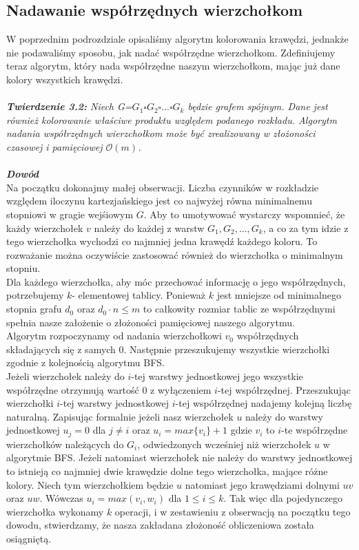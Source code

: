 \documentclass[12pt,a4paper,titlepage]{article}
\begin{document}
\subsection{Nadawanie współrzędnych wierzchołkom}
W poprzednim podrozdziale opisaliśmy algorytm kolorowania krawędzi, jednakże nie podawaliśmy sposobu, jak nadać współrzędne wierzchołkom. Zdefiniujemy teraz algorytm, który nada współrzędne naszym wierzchołkom, mając już dane kolory wszystkich krawędzi.\\
\\
\textit{\textbf{Twierdzenie 3.2:} Niech G=$G_1 \square G_2 \square ... \square G_k$ będzie grafem spójnym. Dane jest również kolorowanie właściwe produktu względem podanego rozkładu. Algorytm nadania współrzędnych wierzchołkom może być zrealizowany w złożoności czasowej i pamięciowej $\mathcal{O}(m)$.}\\
\\
\textit{\textbf{Dowód}}\\
Na początku dokonajmy małej obserwacji. Liczba czynników w rozkładzie względem iloczynu kartezjańskiego jest co najwyżej równa minimalnemu stopniowi w gragie wejśiowym $G$. Aby to umotywować wystarczy wspomnieć, że każdy wierzchołek $v$ należy do każdej z warstw $G_1, G_2, ..., G_k$, a co za tym idzie z tego wierzchołka wychodzi co najmniej jedna krawędź każdego koloru. To rozważanie można oczywiście zastosować również do wierzchołka o minimalnym stopniu.\\
Dla każdego wierzchołka, aby móc przechować informację o jego współrzędnych, potrzebujemy $k$- elementowej tablicy. Ponieważ $k$ jest mniejsze od minimalnego stopnia grafu $d_0$ oraz $d_0 \cdot n \leqslant m$ to całkowity rozmiar tablic ze współrzędnymi spełnia nasze założenie o złożoności pamięciowej naszego algorytmu.\\
Algorytm rozpoczynamy od nadania wierzchołkowi $v_0$ współrzędnych składających się z samych 0. Następnie przeszukujemy wszystkie wierzchołki zgodnie z kolejnością algorytmu BFS. \\Jeżeli wierzchołek należy do $i$-tej warstwy jednostkowej jego wszystkie współrzędne otrzymują wartość 0 z wyłączeniem $i$-tej współrzędnej. Przeszukując wierzchołki $i$-tej warstwy jednostkowej $i$-tej współrzędnej nadajemy kolejną liczbę naturalną. Zapisując formalnie jeżeli nasz wierzchołek $u$ należy do warstwy jednostkowej $u_j =0$ dla $j \neq i$
oraz $u_i = max\{v_i\}+1$ gdzie $v_i $ to $i$-te współrzędne wierzchołków należących do $G_i$, odwiedzonych wcześniej niż wierzchołek $u$ w algorytmie BFS. 
Jeżeli natomiast wierzchołek nie należy do warstwy jednostkowej to istnieją co najmniej dwie krawędzie dolne tego wierzchołka, mające różne kolory. Niech tym wierzchołkiem będzie $u$ natomiast jego krawędziami dolnymi $uv$ oraz $uw$. Wówczas $u_i = max(v_i , w_i )$ dla $1 \leqslant i \leqslant k$. Tak więc dla pojedynczego wierzchołka wykonamy $k$ operacji, i w zestawieniu z obserwacją na początku tego dowodu, stwierdzamy, że nasza zakładana złożoność obliczeniowa została osiągniętą.
\newpage
\end{document}
